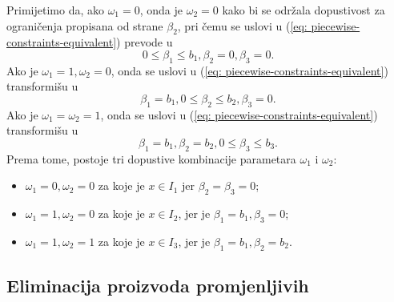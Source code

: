 \documentclass[b5paper, utf8, 11pt, colorlinks]{book}
\theoremstyle{definition}
\begin{document}
Primijetimo da, ako $\omega_1 = 0$, onda je $\omega_2= 0$ kako bi se održala dopustivost za ograničenja propisana  od strane $\beta_2$, pri čemu se uslovi u (\ref{eq: piecewise-constraints-equivalent}) prevode u
$$ 0 \leq \beta_1 \leq b_1, \beta_2 =0, \beta_3 =0.$$
Ako je $\omega_1 = 1, \omega_2 = 0$, onda se uslovi u (\ref{eq: piecewise-constraints-equivalent}) transformišu u
$$   \beta_1 = b_1, 0 \leq \beta_2 \leq b_2, \beta_3 =0.$$
Ako je $\omega_1 = \omega_2 = 1$, onda se  uslovi u (\ref{eq: piecewise-constraints-equivalent}) transformišu u
$$ \beta_1 = b_1, \beta_2 = b_2, 0 \leq \beta_3 \leq b_3.$$
Prema tome, postoje tri dopustive kombinacije parametara $\omega_1$ i $\omega_2$:
\begin{itemize}
	\item  $\omega_1 = 0, \omega_2= 0$ za koje je $x \in I_1$ jer $\beta_2=\beta_3=0$;  
	\item $\omega_1 = 1, \omega_2 = 0$ za koje je $x\in I_2$, jer je $\beta_1=b_1, \beta_3=0$;
	\item $\omega_1 = 1, \omega_2 = 1$ za koje je $x\in I_3$, jer je $\beta_1=b_1, \beta_2=b_2$.
\end{itemize}


\subsection{Eliminacija proizvoda promjenljivih}
\end{document}
